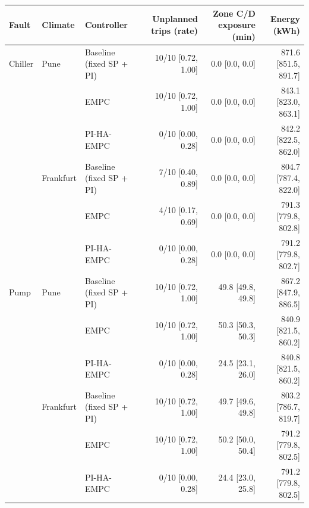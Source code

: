 \begin{tabular}{lllrrr}
\toprule
Fault & Climate & Controller & Unplanned trips (rate) & Zone C/D exposure (min) & Energy (kWh)\\
\midrule
Chiller & Pune & Baseline (fixed SP + PI) & 10/10 {\scriptsize[0.72, 1.00]} & 0.0 {\scriptsize[0.0, 0.0]} & 871.6 {\scriptsize[851.5, 891.7]}\\
 &  & EMPC & 10/10 {\scriptsize[0.72, 1.00]} & 0.0 {\scriptsize[0.0, 0.0]} & 843.1 {\scriptsize[823.0, 863.1]}\\
 &  & PI-HA-EMPC & 0/10 {\scriptsize[0.00, 0.28]} & 0.0 {\scriptsize[0.0, 0.0]} & 842.2 {\scriptsize[822.5, 862.0]}\\
 & Frankfurt & Baseline (fixed SP + PI) & 7/10 {\scriptsize[0.40, 0.89]} & 0.0 {\scriptsize[0.0, 0.0]} & 804.7 {\scriptsize[787.4, 822.0]}\\
 &  & EMPC & 4/10 {\scriptsize[0.17, 0.69]} & 0.0 {\scriptsize[0.0, 0.0]} & 791.3 {\scriptsize[779.8, 802.8]}\\
 &  & PI-HA-EMPC & 0/10 {\scriptsize[0.00, 0.28]} & 0.0 {\scriptsize[0.0, 0.0]} & 791.2 {\scriptsize[779.8, 802.7]}\\
\midrule
Pump & Pune & Baseline (fixed SP + PI) & 10/10 {\scriptsize[0.72, 1.00]} & 49.8 {\scriptsize[49.8, 49.8]} & 867.2 {\scriptsize[847.9, 886.5]}\\
 &  & EMPC & 10/10 {\scriptsize[0.72, 1.00]} & 50.3 {\scriptsize[50.3, 50.3]} & 840.9 {\scriptsize[821.5, 860.2]}\\
 &  & PI-HA-EMPC & 0/10 {\scriptsize[0.00, 0.28]} & 24.5 {\scriptsize[23.1, 26.0]} & 840.8 {\scriptsize[821.5, 860.2]}\\
 & Frankfurt & Baseline (fixed SP + PI) & 10/10 {\scriptsize[0.72, 1.00]} & 49.7 {\scriptsize[49.6, 49.8]} & 803.2 {\scriptsize[786.7, 819.7]}\\
 &  & EMPC & 10/10 {\scriptsize[0.72, 1.00]} & 50.2 {\scriptsize[50.0, 50.4]} & 791.2 {\scriptsize[779.8, 802.5]}\\
 &  & PI-HA-EMPC & 0/10 {\scriptsize[0.00, 0.28]} & 24.4 {\scriptsize[23.0, 25.8]} & 791.2 {\scriptsize[779.8, 802.5]}\\
\bottomrule
\end{tabular}

